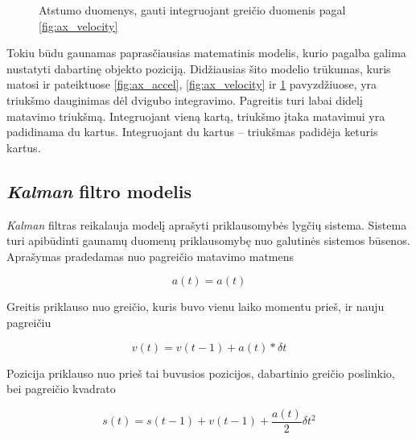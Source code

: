 \begin{figure}
    \centering
    \caption{Atstumo duomenys, gauti integruojant greičio duomenis pagal \ref{fig:ax_velocity}}
    \label{fig:ax_distance}
\end{figure}

Tokiu būdu gaunamas paprasčiausias matematinis modelis, kurio pagalba galima nustatyti dabartinę objekto poziciją.
Didžiausias šito modelio trūkumas, kuris matosi ir pateiktuose \ref{fig:ax_accel}, \ref{fig:ax_velocity} ir \ref{fig:ax_distance} pavyzdžiuose, yra triukšmo dauginimas dėl dvigubo integravimo.
Pagreitis turi labai didelį matavimo triukšmą.
Integruojant vieną kartą, triukšmo įtaka matavimui yra padidinama du kartus.
Integruojant du kartus -- triukšmas padidėja keturis kartus.

\subsection{\textit{Kalman} filtro modelis}

\textit{Kalman} filtras reikalauja modelį aprašyti priklausomybės lygčių sistema.
Sistema turi apibūdinti gaunamų duomenų priklausomybę nuo galutinės sistemos būsenos.
Aprašymas pradedamas nuo pagreičio matavimo matmens

\begin{equation}
    a(t) = a(t)
\end{equation}

Greitis priklauso nuo greičio, kuris buvo vienu laiko momentu prieš, ir nauju pagreičiu

\begin{equation}
    v(t) = v(t-1) + a(t) * \delta t
\end{equation}

Pozicija priklauso nuo prieš tai buvusios pozicijos, dabartinio greičio poslinkio, bei pagreičio kvadrato

\begin{equation}
    s(t) = s(t-1) + v(t-1) + \frac{a(t)}{2}\delta t^2
\end{equation}

